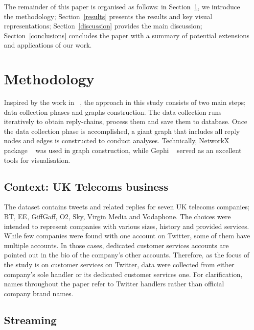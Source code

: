 \documentclass[sigconf]{acmart}
\begin{document}
The remainder of this paper is organised as follows: in
Section~\ref{method}, we introduce the methodology;
Section~\ref{results} presents the results and key visual
representations; Section~\ref{discussion} provides the main
discussion; Section~\ref{conclusions} concludes the paper with a
summary of potential extensions and applications of our work.


\section{Methodology}\label{method}

Inspired by the work in ~\cite{Cogan2012}, the approach in this study consists of 
two main steps; data collection phases and graphs construction. The data 
collection runs iteratively to obtain reply-chains, process them and save them to
database. Once the data collection phase is accomplished, a giant
graph that includes all reply nodes and edges is constructed to conduct analyses.
Technically, NetworkX package ~\cite{Hagberg2008} was used in graph construction, 
while Gephi ~\cite{Bastian2009} served as an excellent tools for visualisation.  


\subsection{Context: UK Telecoms business}

The dataset contains tweets and related replies for seven UK telecoms 
companies; BT, EE, GiffGaff, O2, Sky, Virgin Media and Vodaphone. 
The choices were intended to represent companies with various sizes, 
history and provided services. While few companies were found with 
one account on Twitter, some of them have multiple accounts. In those 
cases, dedicated customer services accounts are pointed out in the bio 
of the company’s other accounts. Therefore, as the focus of the study 
is on customer services on Twitter, data were collected from either 
company’s sole handler or its dedicated customer services one. 
For clarification, names throughout the paper refer to Twitter handlers 
rather than official company brand names.    

\subsection{Streaming}
\end{document}
